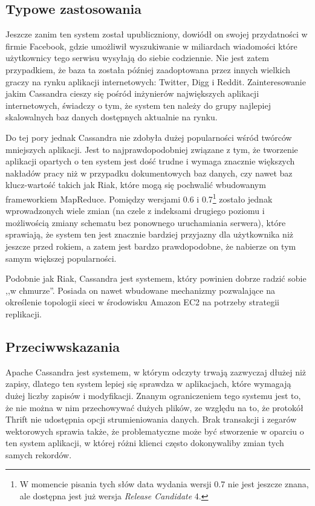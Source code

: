 \subsection*{Typowe zastosowania}

Jeszcze zanim ten system został upubliczniony, dowiódł on swojej przydatności w firmie Facebook, gdzie umożliwił wyszukiwanie w miliardach wiadomości które użytkownicy tego serwisu wysyłają do siebie codziennie.
Nie jest zatem przypadkiem, że baza ta została później zaadoptowana przez innych wielkich graczy na rynku aplikacji internetowych: Twitter, Digg i Reddit.
Zainteresowanie jakim Cassandra cieszy się pośród inżynierów największych aplikacji internetowych, świadczy o tym, że system ten należy do grupy najlepiej skalowalnych baz danych dostępnych aktualnie na rynku.

Do tej pory jednak Cassandra nie zdobyła dużej popularności wśród twórców mniejszych aplikacji.
Jest to najprawdopodobniej związane z tym, że tworzenie aplikacji opartych o ten system jest dość trudne i wymaga znacznie większych nakładów pracy niż w przypadku dokumentowych baz danych, czy nawet baz klucz-wartość takich jak Riak, które mogą się pochwalić wbudowanym frameworkiem MapReduce. 
Pomiędzy wersjami 0.6 i 0.7\footnote{W momencie pisania tych słów data wydania wersji 0.7 nie jest jeszcze znana, ale dostępna jest już wersja \emph{Release Candidate} 4.} zostało jednak wprowadzonych wiele zmian (na czele z indeksami drugiego poziomu i możliwością zmiany schematu bez ponownego uruchamiania serwera), które sprawiają, że system ten jest znacznie bardziej przyjazny dla użytkownika niż jeszcze przed rokiem, a zatem jest bardzo prawdopodobne, że nabierze on tym samym większej popularności.

Podobnie jak Riak, Cassandra jest systemem, który powinien dobrze radzić sobie ,,w chmurze''.
Posiada on nawet wbudowane mechanizmy pozwalające na określenie topologii sieci w środowisku Amazon EC2 na potrzeby strategii replikacji.

\subsection*{Przeciwwskazania}

Apache Cassandra jest systemem, w którym odczyty trwają zazwyczaj dłużej niż zapisy, dlatego ten system lepiej się sprawdza w aplikacjach, które wymagają dużej liczby zapisów i modyfikacji.
Znanym ograniczeniem tego systemu jest to, że nie można w nim przechowywać dużych plików, ze względu na to, że protokół Thrift nie udostępnia opcji strumieniowania danych.
Brak transakcji i zegarów wektorowych sprawia także, że problematyczne może być stworzenie w oparciu o ten system aplikacji, w której różni klienci często dokonywaliby zmian tych samych rekordów. 

